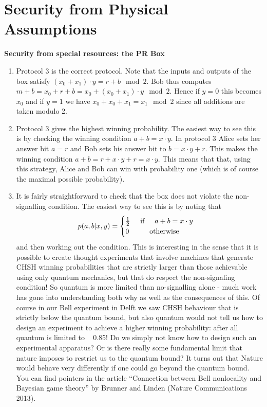 
\chapter{Security from Physical Assumptions}

\begin{exercises}


\item {\bf Security from special resources: the PR Box}
\begin{enumerate}
\item Protocol 3 is the correct protocol. Note that the inputs and outputs of the box satisfy \((x_0+x_1)\cdot y = r+b \mod 2\). Bob thus computes \( m+b = x_0 + r + b = x_0 + (x_0+x_1) \cdot y\mod 2\). Hence if \(y=0\) this becomes \(x_0\) and if \(y=1\) we have \(x_0 + x_0 + x_1 = x_1\mod 2\) since all additions are taken modulo 2.
\item Protocol 3 gives the highest winning probability. The easiest way to see this is by checking the winning condition \(a + b = x\cdot y\). In protocol 3 Alice sets her answer bit \(a =r\) and Bob sets his answer bit to \( b= x\cdot y + r\). This makes the winning condition \( a+b = r + x\cdot y + r = x\cdot y\). This means that that, using this strategy, Alice and Bob can win with probability one (which is of course the maximal possible probability).
\item It is fairly straightforward to check that the box does not violate the non-signalling condition. The easiest way to see this is by noting that
\[p(a,b|x,y) = \begin{cases} \frac{1}{2} \hspace{5mm} \text{if}\hspace{5mm} a+ b = x\cdot y \\
0\hspace{5mm} \hspace{5mm}\text{otherwise}\end{cases}
\] and then working out the condition. This is interesting in the sense that it is possible to create thought experiments that involve machines that generate CHSH winning probabilities that are strictly larger than those achievable using only quantum mechanics, but that do respect the non-signaling condition! So quantum is more limited than no-signalling alone - much work has gone into understanding both why as well as the consequences of this. Of course in our Bell experiment in Delft we saw CHSH behaviour that is strictly below the quantum bound, but also quantum would not tell us how to design an experiment to achieve a higher winning probability: after all quantum is limited to ~ 0.85! Do we simply not know how to design such an experimental apparatus? Or is there really some fundamental limit that nature imposes to restrict us to the quantum bound? It turns out that Nature would behave very differently if one could go beyond the quantum bound. You can find pointers in the article ``Connection between Bell nonlocality and Bayesian game theory'' by Brunner and Linden (Nature Communications 2013). 

\end{enumerate}
\end{exercises}
